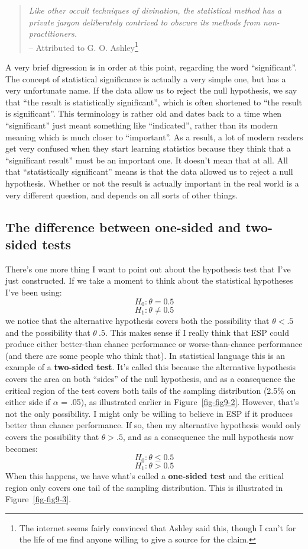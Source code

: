 \documentclass[
  a4paper,
]{book}
\begin{document}
\begin{quote}
\emph{Like other occult techniques of divination, the statistical method
has a private jargon deliberately contrived to obscure its methods from
non-practitioners.}\\
-- Attributed to G. O. Ashley\footnote{The internet seems fairly
  convinced that Ashley said this, though I can't for the life of me
  find anyone willing to give a source for the claim.}
\end{quote}

A very brief digression is in order at this point, regarding the word
``significant''. The concept of statistical significance is actually a
very simple one, but has a very unfortunate name. If the data allow us
to reject the null hypothesis, we say that ``the result is statistically
significant'', which is often shortened to ``the result is
significant''. This terminology is rather old and dates back to a time
when ``significant'' just meant something like ``indicated'', rather
than its modern meaning which is much closer to ``important''. As a
result, a lot of modern readers get very confused when they start
learning statistics because they think that a ``significant result''
must be an important one. It doesn't mean that at all. All that
``statistically significant'' means is that the data allowed us to
reject a null hypothesis. Whether or not the result is actually
important in the real world is a very different question, and depends on
all sorts of other things.

\subsection{The difference between one-sided and two-sided
tests}\label{sec-The-difference-between-one-sided-and-two-sided-tests}

There's one more thing I want to point out about the hypothesis test
that I've just constructed. If we take a moment to think about the
statistical hypotheses I've been using: \[H_0: \theta=0.5\]
\[H_1:\theta \neq 0.5\] we notice that the alternative hypothesis covers
both the possibility that \(\theta < .5\) and the possibility that
\(\theta \> .5.\) This makes sense if I really think that ESP could
produce either better-than chance performance or worse-than-chance
performance (and there are some people who think that). In statistical
language this is an example of a \textbf{two-sided test}. It's called
this because the alternative hypothesis covers the area on both
``sides'' of the null hypothesis, and as a consequence the critical
region of the test covers both tails of the sampling distribution (2.5\%
on either side if \(\alpha\) = .05), as illustrated earlier in
Figure~\ref{fig-fig9-2}. However, that's not the only possibility. I
might only be willing to believe in ESP if it produces better than
chance performance. If so, then my alternative hypothesis would only
covers the possibility that \(\theta > .5\), and as a consequence the
null hypothesis now becomes: \[H_0: \theta \leq 0.5\]
\[H_1: \theta > 0.5\] When this happens, we have what's called a
\textbf{one-sided test} and the critical region only covers one tail of
the sampling distribution. This is illustrated in
Figure~\ref{fig-fig9-3}.
\end{document}
